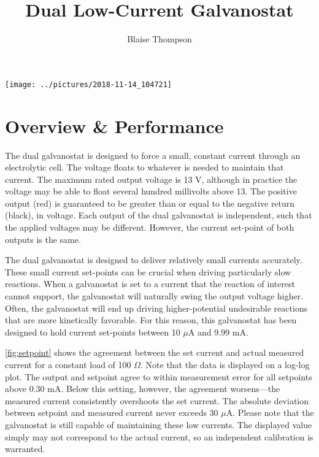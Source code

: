 \documentclass{manual}
\title{Dual Low-Current Galvanostat}
\author{Blaise Thompson}
\begin{document}
\maketitle

\vspace*{\fill}
\begin{center}
  \texttt{[image: ../pictures/2018-11-14\_104721]}
\end{center}
\vspace*{\fill}

\section{Overview \& Performance}

The dual galvanostat is designed to force a small, constant current through an electrolytic cell.
The voltage floats to whatever is needed to maintain that current.
The maximum rated output voltage is 13 V, although in practice the voltage may be able to float several hundred millivolts above 13.
The positive output (red) is guaranteed to be greater than or equal to the negative return (black), in voltage.
Each output of the dual galvanostat is independent, such that the applied voltages may be different.
However, the current set-point of both outputs is the same.

The dual galvanostat is designed to deliver relatively small currents accurately.
These small current set-points can be crucial when driving particularly slow reactions.
When a galvanostat is set to a current that the reaction of interest cannot support, the galvanostat will naturally swing the output voltage higher.
Often, the galvanostat will end up driving higher-potential undesirable reactions that are more kinetically favorable.
For this reason, this galvanostat has been designed to hold current set-points between 10 $\mu$A and 9.99 mA.

\autoref{fig:setpoint} shows the agreement between the set current and actual measured current for a constant load of 100 $\Omega$.
Note that the data is displayed on a log-log plot.
The output and setpoint agree to within measurement error for all setpoints above 0.30 mA.
Below this setting, however, the agreement worsens---the measured current consistently overshoots the set current.
The absolute deviation between setpoint and measured current never exceeds 30 $\mu$A.
Please note that the galvanostat is still capable of maintaining these low currents.
The displayed value simply may not correspond to the actual current, so an independent calibration is warranted.
\end{document}
